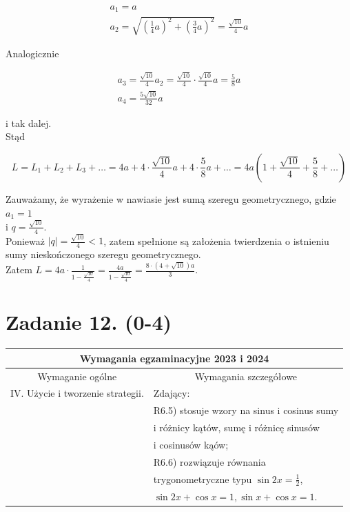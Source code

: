 \documentclass[10pt]{article}
\begin{document}
$$
\begin{gathered}
a_{1}=a \\
a_{2}=\sqrt{\left(\frac{1}{4} a\right)^{2}+\left(\frac{3}{4} a\right)^{2}}=\frac{\sqrt{10}}{4} a
\end{gathered}
$$

Analogicznie

$$
\begin{gathered}
a_{3}=\frac{\sqrt{10}}{4} a_{2}=\frac{\sqrt{10}}{4} \cdot \frac{\sqrt{10}}{4} a=\frac{5}{8} a \\
a_{4}=\frac{5 \sqrt{10}}{32} a
\end{gathered}
$$

i tak dalej.\\
Stąd

$$
L=L_{1}+L_{2}+L_{3}+\ldots=4 a+4 \cdot \frac{\sqrt{10}}{4} a+4 \cdot \frac{5}{8} a+\ldots=4 a\left(1+\frac{\sqrt{10}}{4}+\frac{5}{8}+\ldots\right)
$$

Zauważamy, że wyrażenie w nawiasie jest sumą szeregu geometrycznego, gdzie $a_{1}=1$\\
i $q=\frac{\sqrt{10}}{4}$.\\
Ponieważ $|q|=\frac{\sqrt{10}}{4}<1$, zatem spełnione są założenia twierdzenia o istnieniu sumy nieskończonego szeregu geometrycznego.\\
Zatem $L=4 a \cdot \frac{1}{1-\frac{\sqrt{10}}{4}}=\frac{4 a}{1-\frac{\sqrt{10}}{4}}=\frac{8 \cdot(4+\sqrt{10}) a}{3}$.

\section*{Zadanie 12. (0-4)}
\begin{center}
\begin{tabular}{|l|l|}
\hline
\multicolumn{2}{|c|}{Wymagania egzaminacyjne 2023 i 2024} \\
\hline
\multicolumn{1}{|c|}{Wymaganie ogólne} & \multicolumn{1}{|c|}{Wymagania szczegółowe} \\
\hline
IV. Użycie i tworzenie strategii. & Zdający: \\
 & R6.5) stosuje wzory na sinus i cosinus sumy \\
 & i różnicy kątów, sumę i różnicę sinusów \\
 & i cosinusów kąów; \\
 & R6.6) rozwiązuje równania \\
 & trygonometryczne typu $\sin 2 x=\frac{1}{2}$, \\
 & $\sin 2 x+\cos x=1, \sin x+\cos x=1$. \\
\hline
\end{tabular}
\end{center}
\end{document}
